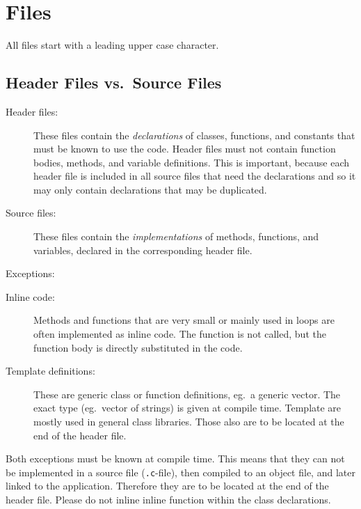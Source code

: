 
\section{Files}

All files start with a leading upper case character.

\subsection{Header Files vs.\ Source Files}

\begin{description}
\item[Header files:]
  These files contain the {\em declarations} of
  classes, functions, and constants that must be known to use the code. Header
  files must not contain function bodies, methods, and variable
  definitions. This is important, because each header file is included in
  all source files that need the declarations and so it may only contain
  declarations that may be duplicated.

\item[Source files:]
  These files contain the {\em implementations} of
  methods, functions, and variables, declared in the corresponding header file.
\end{description}

Exceptions: 

\begin{description}
\item[Inline code:] Methods and functions that are very small or
  mainly used in loops are often implemented as inline code. The
  function is not called, but the function body is directly
  substituted in the code.
\item[Template definitions:]
  These are generic class or function
  definitions, eg.\ a generic vector. The exact type (eg.\ vector of strings)
  is given at compile time. Template are mostly used in general class
  libraries. Those also are to be located at the end of the header file.
\end{description}

Both exceptions must be known at compile time. This means that they can not be
implemented in a source file ({\tt .c}-file), then compiled to an object
file, and later linked to the application. 
Therefore they are to be located at the end of the
header file. Please do not inline inline function within the class
declarations.

